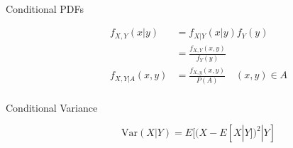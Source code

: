 \documentclass[8pt]{article}
\begin{document}
\begin{multicols}{2}
\begin{description}
\begin{equation*}
\begin{aligned}
    \end{aligned}
  \end{equation*}
\item[Conditional PDFs]
  \begin{equation*}
    \begin{aligned}
      f_{X,Y}(x|y) &= f_{X|Y}(x|y)f_Y(y) \\
      &= \frac{f_{X,Y}(x,y)}{f_Y(y)} \\
      f_{X,Y|A}(x,y) &= \frac{f_{X,y}(x,y)}{P(A)}\quad (x,y)\in A \\
    \end{aligned}
  \end{equation*}
\item[Conditional Variance]
  $$ \text{Var}(X|Y) = E[(X-E[X|Y])^2|Y] $$
\end{description}
\end{multicols}
\end{document}
